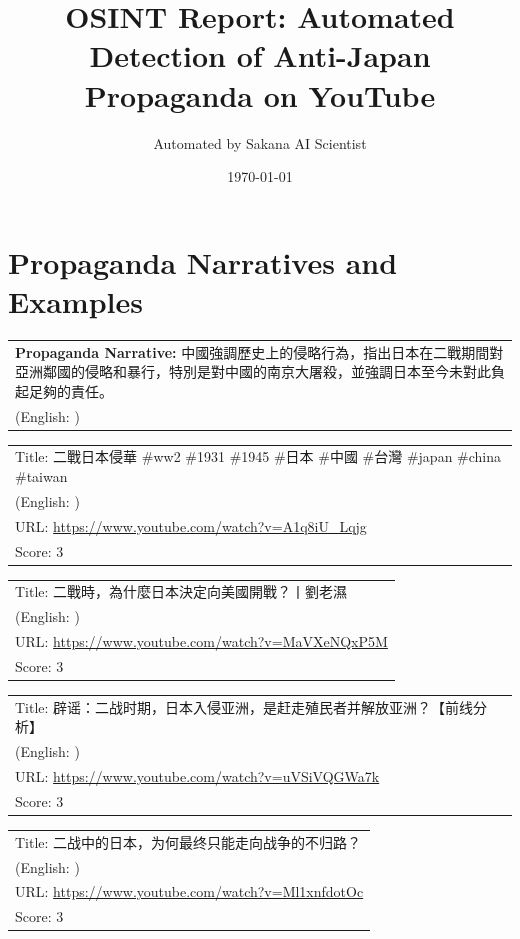 \documentclass{article}
\title{OSINT Report: Automated Detection of Anti-Japan Propaganda on YouTube}
\author{Automated by Sakana AI Scientist}
\date{\today}
\begin{document}
\maketitle

\section*{Propaganda Narratives and Examples}
\noindent
\begin{tabular}{p{}}
\textbf{Propaganda Narrative:} 中國強調歷史上的侵略行為，指出日本在二戰期間對亞洲鄰國的侵略和暴行，特別是對中國的南京大屠殺，並強調日本至今未對此負起足夠的責任。 \\
(English: ) \\
\end{tabular}

\noindent
\begin{tabular}{p{}}
Title: 二戰日本侵華 \#ww2 \#1931 \#1945 \#日本 \#中國 \#台灣 \#japan \#china \#taiwan \\
(English: ) \\
URL: \url{https://www.youtube.com/watch?v=A1q8iU_Lqjg} \\
Score: 3 \\
\end{tabular}
\vspace{0.5em}

\noindent
\begin{tabular}{p{}}
Title: 二戰時，為什麼日本決定向美國開戰？丨劉老濕 \\
(English: ) \\
URL: \url{https://www.youtube.com/watch?v=MaVXeNQxP5M} \\
Score: 3 \\
\end{tabular}
\vspace{0.5em}

\noindent
\begin{tabular}{p{}}
Title: 辟谣：二战时期，日本入侵亚洲，是赶走殖民者并解放亚洲？【前线分析】 \\
(English: ) \\
URL: \url{https://www.youtube.com/watch?v=uVSiVQGWa7k} \\
Score: 3 \\
\end{tabular}
\vspace{0.5em}

\noindent
\begin{tabular}{p{}}
Title: 二战中的日本，为何最终只能走向战争的不归路？ \\
(English: ) \\
URL: \url{https://www.youtube.com/watch?v=Ml1xnfdotOc} \\
Score: 3 \\
\end{tabular}
\vspace{0.5em}
\end{document}
